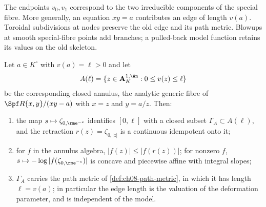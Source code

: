 The endpoints $v_0,v_1$ correspond to the two irreducible components of the
special fibre.  More generally, an equation $xy=a$ contributes an edge of
length $v(a)$.  Toroidal subdivisions at nodes preserve the old edge
and its path metric.  Blowups at smooth special-fibre points add branches;
a pulled-back model function retains its values on the old skeleton.

\begin{proposition}
\label{prop:ch08-annulus-skeleton}
Let $a\in K^\circ$ with $v(a)=\ell>0$ and let
\[
 A(\ell)=\{z\in\mathbf A^{1,\An}_K:0\leq v(z)\leq\ell\}
\]
be the corresponding closed annulus, the analytic generic fibre of
$\Spf R\{x,y\}/(xy-a)$ with $x=z$ and $y=a/z$.  Then:
\begin{enumerate}
\item the map $s\mapsto\zeta_{0,\rme^{-s}}$ identifies $[0,\ell]$ with a
closed subset $\Gamma_{A}\subset A(\ell)$, and the retraction
$r(z)=\zeta_{0,|z|}$ is a continuous idempotent onto it;
\item for $f$ in the annulus algebra, $|f(z)|\leq|f(r(z))|$; for nonzero $f$,
$s\mapsto-\log|f(\zeta_{0,\rme^{-s}})|$ is concave and piecewise affine with
integral slopes;
\item $\Gamma_A$ carries the path metric of \cref{def:ch08-path-metric}, in
which it has length $\ell=v(a)$; in particular the edge length is the
valuation of the deformation parameter, and is independent of the model.
\end{enumerate}
\end{proposition}

